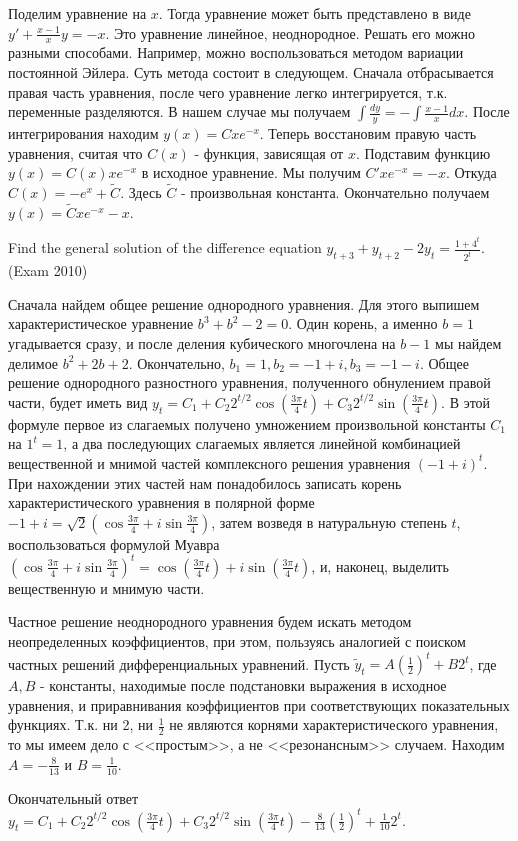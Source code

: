 \begin{solution}
Поделим уравнение на $x$. Тогда уравнение может быть представлено в виде $y'+\frac{x-1}{x} y=-x$. Это уравнение линейное, неоднородное. Решать его можно разными способами. Например, можно воспользоваться методом вариации постоянной Эйлера. Суть метода состоит в следующем. Сначала отбрасывается правая часть уравнения, после чего уравнение легко интегрируется, т.к. переменные разделяются. В нашем случае мы получаем $\int \frac{dy}{y} =-\int \frac{x-1}{x} dx  $. После интегрирования находим $y(x)=Cxe^{-x} $. Теперь восстановим правую часть уравнения, считая что $C(x)$ - функция, зависящая от $x$. Подставим функцию $y(x)=C(x)xe^{-x} $ в исходное уравнение. Мы получим $C'xe^{-x} =-x$. Откуда $C(x)=-e^{x} +\tilde{C}$. Здесь $\tilde{C}$ - произвольная константа. Окончательно получаем $y(x)=\tilde{C}xe^{-x} -x$.
\end{solution}

\begin{problem}
Find the general solution of the difference equation $y_{t+3} +y_{t+2} -2y_{t} =\frac{1+4^{t} }{2^{t} } $. (Exam 2010)
\end{problem}

\begin{solution}
Сначала найдем общее решение однородного уравнения. Для этого выпишем характеристическое уравнение $b^{3} +b^{2} -2=0$. Один корень, а именно $b=1$ угадывается сразу, и после деления кубического многочлена на $b-1$ мы найдем делимое $b^{2} +2b+2$. Окончательно, $b_{1} =1, b_{2} =-1+i, b_{3} =-1-i$. Общее решение однородного разностного уравнения, полученного обнулением правой части, будет иметь вид $y_{t} =C_{1} +C_{2} 2^{t/2} \cos (\frac{3\pi }{4} t)+C_{3} 2^{t/2} \sin (\frac{3\pi }{4} t)$. В этой формуле первое из слагаемых получено умножением произвольной константы $C_{1} $ на $1^{t} =1$, а два последующих слагаемых является линейной комбинацией вещественной и мнимой частей комплексного решения уравнения $(-1+i)^{t} $. При нахождении этих частей нам понадобилось записать корень характеристического уравнения в полярной форме $-1+i=\sqrt{2} (\cos \frac{3\pi }{4} +i\sin \frac{3\pi }{4} )$, затем возведя в натуральную степень $t$, воспользоваться формулой Муавра $(\cos \frac{3\pi }{4} +i\sin \frac{3\pi }{4} )^{t} =\cos (\frac{3\pi }{4} t)+i\sin (\frac{3\pi }{4} t)$, и, наконец, выделить вещественную и мнимую части.

Частное решение неоднородного уравнения будем искать методом неопределенных коэффициентов, при этом, пользуясь аналогией с поиском частных решений дифференциальных уравнений. Пусть $\tilde{y}_{t} =A(\frac{1}{2} )^{t} +B2^{t} $, где $A, B$ - константы, находимые после подстановки выражения в исходное уравнения, и приравнивания коэффициентов при соответствующих показательных функциях. Т.к. ни 2, ни $\frac{1}{2} $ не являются корнями характеристического уравнения, то мы имеем дело с <<простым>>, а не <<резонансным>> случаем. Находим $A=-\frac{8}{13} $ и $B=\frac{1}{10} $.

Окончательный ответ $y_{t} =C_{1} +C_{2} 2^{t/2} \cos (\frac{3\pi }{4} t)+C_{3} 2^{t/2} \sin (\frac{3\pi }{4} t)-\frac{8}{13} (\frac{1}{2} )^{t} +\frac{1}{10} 2^{t} $.
\end{solution}


